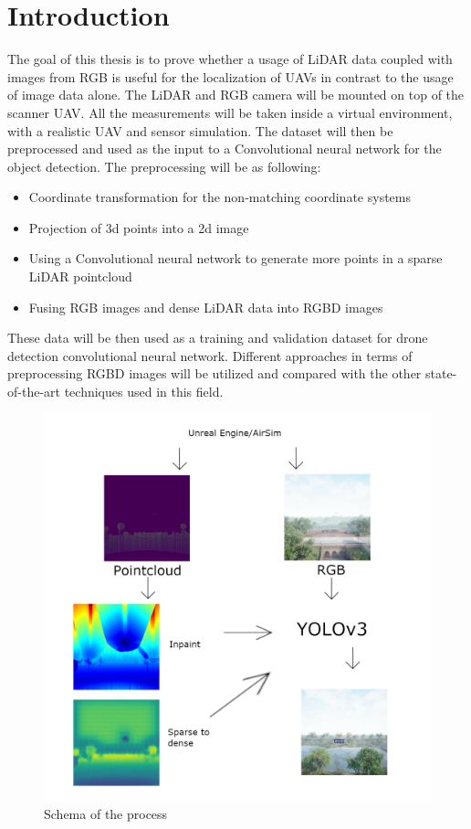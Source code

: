 \documentclass[twoside]{ctuthesis}
\theoremstyle{plain}
\theoremstyle{definition}
\theoremstyle{note}
\begin{document}
\maketitle
\chapter{Introduction}
The goal of this thesis is to prove whether a usage of LiDAR data coupled with images from RGB is useful for the localization of UAVs in contrast to the usage of image data alone. The LiDAR and RGB camera will be mounted on top of the scanner UAV. All the measurements will be taken inside a virtual environment, with a realistic UAV and sensor simulation. The dataset will then be preprocessed and used as the input to a Convolutional neural network for the object detection. The preprocessing will be as following:
\begin{itemize}
	\item Coordinate transformation for the non-matching coordinate systems
	\item Projection of 3d points into a 2d image
	\item Using a Convolutional neural network to generate more points in a sparse LiDAR pointcloud
	\item Fusing RGB images and dense LiDAR data into RGBD images
\end{itemize}
These data will be then used as a training and validation dataset for drone detection convolutional neural network. Different approaches in terms of preprocessing RGBD images will be utilized and compared with the other state-of-the-art techniques used in this field.
\begin{figure}[h]
	\centering
	\includegraphics[width=\textwidth]{intro_schema.png}
	\caption{Schema of the process}
\end{figure}
\pagebreak
\end{document}
